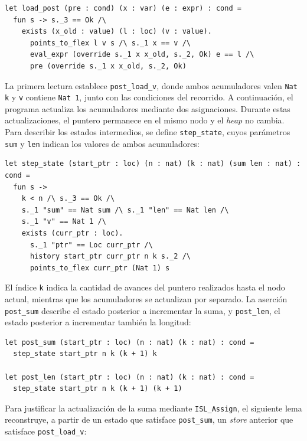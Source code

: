 \documentclass[a4paper,	11pt]{report}
\begin{document}
\begin{lstlisting}
let load_post (pre : cond) (x : var) (e : expr) : cond =
  fun s -> s._3 == Ok /\
    exists (x_old : value) (l : loc) (v : value).
      points_to_flex l v s /\ s._1 x == v /\
      eval_expr (override s._1 x x_old, s._2, Ok) e == l /\
      pre (override s._1 x x_old, s._2, Ok)
\end{lstlisting}

La primera lectura establece \lstinline|post_load_v|,
donde ambos acumuladores valen \lstinline|Nat k| y \lstinline|v| contiene \lstinline|Nat 1|,
junto con las condiciones del recorrido.
A continuación,
el programa actualiza los acumuladores mediante dos asignaciones.
Durante estas actualizaciones,
el puntero permanece en el mismo nodo y el \emph{heap} no cambia.
Para describir los estados intermedios,
se define \lstinline|step_state|,
cuyos parámetros \lstinline|sum| y \lstinline|len| indican los valores de ambos acumuladores:

\begin{lstlisting}
let step_state (start_ptr : loc) (n : nat) (k : nat) (sum len : nat) : cond =
  fun s ->
    k < n /\ s._3 == Ok /\
    s._1 "sum" == Nat sum /\ s._1 "len" == Nat len /\
    s._1 "v" == Nat 1 /\
    exists (curr_ptr : loc).
      s._1 "ptr" == Loc curr_ptr /\
      history start_ptr curr_ptr n k s._2 /\
      points_to_flex curr_ptr (Nat 1) s
\end{lstlisting}

El índice \lstinline|k| indica la cantidad de avances del puntero realizados hasta el nodo actual,
mientras que los acumuladores se actualizan por separado.
La aserción \lstinline|post_sum| describe el estado posterior a incrementar la suma,
y \lstinline|post_len|,
el estado posterior a incrementar también la longitud:

\begin{lstlisting}
let post_sum (start_ptr : loc) (n : nat) (k : nat) : cond =
  step_state start_ptr n k (k + 1) k

let post_len (start_ptr : loc) (n : nat) (k : nat) : cond =
  step_state start_ptr n k (k + 1) (k + 1)
\end{lstlisting}

Para justificar la actualización de la suma mediante \lstinline|ISL_Assign|,
el siguiente lema reconstruye,
a partir de un estado que satisface \lstinline|post_sum|,
un \emph{store} anterior que satisface \lstinline|post_load_v|:
\end{document}
